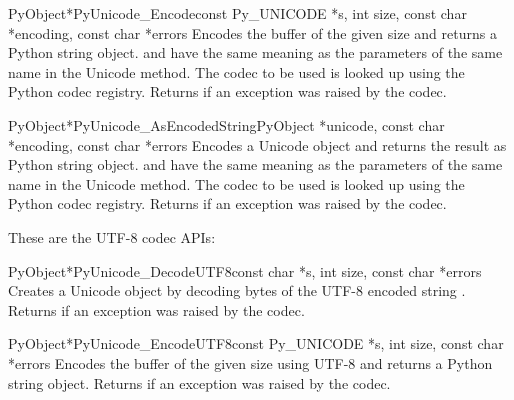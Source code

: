\begin{cfuncdesc}{PyObject*}{PyUnicode_Encode}{const Py_UNICODE *s,
                                               int size,
                                               const char *encoding,
                                               const char *errors}
  Encodes the  buffer of the given size and returns
  a Python string object.   and  have the
  same meaning as the parameters of the same name in the Unicode
   method.  The codec to be used is looked up using
  the Python codec registry.  Returns \NULL{} if an exception was
  raised by the codec.
\end{cfuncdesc}

\begin{cfuncdesc}{PyObject*}{PyUnicode_AsEncodedString}{PyObject *unicode,
                                               const char *encoding,
                                               const char *errors}
  Encodes a Unicode object and returns the result as Python string
  object.  and  have the same meaning as the
  parameters of the same name in the Unicode  method.
  The codec to be used is looked up using the Python codec registry.
  Returns \NULL{} if an exception was raised by the codec.
\end{cfuncdesc}


These are the UTF-8 codec APIs:

\begin{cfuncdesc}{PyObject*}{PyUnicode_DecodeUTF8}{const char *s,
                                               int size,
                                               const char *errors}
  Creates a Unicode object by decoding  bytes of the UTF-8
  encoded string . Returns \NULL{} if an exception was raised
  by the codec.
\end{cfuncdesc}

\begin{cfuncdesc}{PyObject*}{PyUnicode_EncodeUTF8}{const Py_UNICODE *s,
                                               int size,
                                               const char *errors}
  Encodes the  buffer of the given size using UTF-8
  and returns a Python string object.  Returns \NULL{} if an exception
  was raised by the codec.
\end{cfuncdesc}

